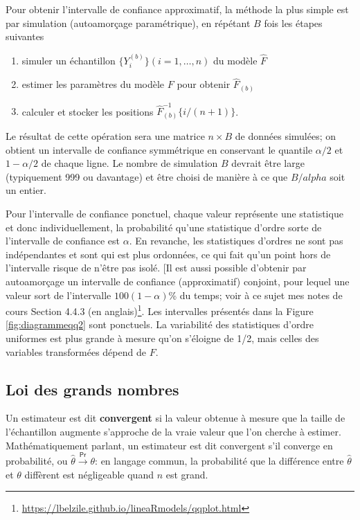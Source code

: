 \documentclass[
  11pt,
  letterpaper,
]{article}
\providecommand{\tightlist}{%
  \setlength{\itemsep}{0pt}\setlength{\parskip}{0pt}}
\renewcommand{\href}[2]{#2\footnote{\url{#1}}}
\theoremstyle{definition}
\theoremstyle{definition}
\theoremstyle{definition}
\theoremstyle{remark}
\begin{document}
Pour obtenir l'intervalle de confiance approximatif, la méthode la plus simple est par simulation (autoamorçage paramétrique), en répétant \(B\) fois les étapes suivantes

\begin{enumerate}
\def\labelenumi{\arabic{enumi}.}
\tightlist
\item
  simuler un échantillon \(\{Y^{(b)}_{i}\} (i=1,\ldots, n)\) du modèle \(\widehat{F}\)
\item
  estimer les paramètres du modèle \(F\) pour obtenir \(\widehat{F}_{(b)}\)
\item
  calculer et stocker les positions \(\widehat{F}^{-1}_{(b)}\{i/(n+1)\}\).
\end{enumerate}

Le résultat de cette opération sera une matrice \(n \times B\) de données simulées; on obtient un intervalle de confiance symmétrique en conservant le quantile \(\alpha/2\) et \(1-\alpha/2\) de chaque ligne. Le nombre de simulation \(B\) devrait être large (typiquement 999 ou davantage) et être choisi de manière à ce que \(B/alpha\) soit un entier.

Pour l'intervalle de confiance ponctuel, chaque valeur représente une statistique et donc individuellement, la probabilité qu'une statistique d'ordre sorte de l'intervalle de confiance est \(\alpha\). En revanche, les statistiques d'ordres ne sont pas indépendantes et sont qui est plus ordonnées, ce qui fait qu'un point hors de l'intervalle risque de n'être pas isolé. {[}Il est aussi possible d'obtenir par autoamorçage un intervalle de confiance (approximatif) conjoint, pour lequel une valeur sort de l'intervalle \(100(1-\alpha)\)\% du temps; \href{https://lbelzile.github.io/lineaRmodels/qqplot.html}{voir à ce sujet mes notes de cours Section 4.4.3 (en anglais)}. Les intervalles présentés dans la Figure \ref{fig:diagrammeqq2} sont ponctuels. La variabilité des statistiques d'ordre uniformes est plus grande à mesure qu'on s'éloigne de 1/2, mais celles des variables transformées dépend de \(F\).

\hypertarget{loi-grands-nombres}{%
\subsection{Loi des grands nombres}\label{loi-grands-nombres}}

Un estimateur est dit \textbf{convergent} si la valeur obtenue à mesure que la taille de l'échantillon augmente s'approche de la vraie valeur que l'on cherche à estimer. Mathématiquement parlant, un estimateur est dit convergent s'il converge en probabilité, ou \(\hat{\theta} \stackrel{\mathsf{Pr}}{\to} \theta\): en langage commun, la probabilité que la différence entre \(\hat{\theta}\) et \(\theta\) diffèrent est négligeable quand \(n\) est grand.
\end{document}
